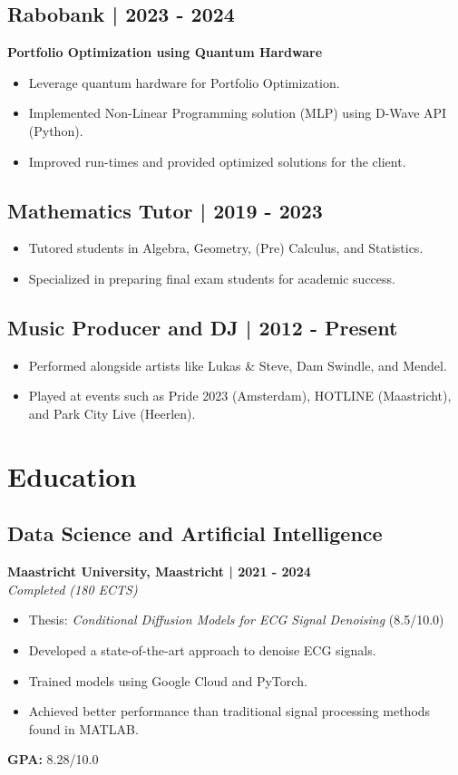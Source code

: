 \documentclass[a4paper,10pt]{article}
\begin{document}
\subsection*{Rabobank | 2023 - 2024}
\textbf{Portfolio Optimization using Quantum Hardware}
\begin{itemize}
    \item Leverage quantum hardware for Portfolio Optimization.
    \item Implemented Non-Linear Programming solution (MLP) using D-Wave API (Python).
    \item Improved run-times and provided optimized solutions for the client.
\end{itemize}

\subsection*{Mathematics Tutor | 2019 - 2023}
\begin{itemize}
    \item Tutored students in Algebra, Geometry, (Pre) Calculus, and Statistics.
    \item Specialized in preparing final exam students for academic success.
\end{itemize}

\subsection*{Music Producer and DJ | 2012 - Present}
\begin{itemize}
    \item Performed alongside artists like Lukas \& Steve, Dam Swindle, and Mendel.
    \item Played at events such as Pride 2023 (Amsterdam), HOTLINE (Maastricht), and Park City Live (Heerlen).
\end{itemize}

\section*{Education}

\subsection*{Data Science and Artificial Intelligence}
\textbf{Maastricht University, Maastricht | 2021 - 2024} \\
\textit{Completed (180 ECTS)}
\begin{itemize}
    \item Thesis: \textit{Conditional Diffusion Models for ECG Signal Denoising} (8.5/10.0)
    \item Developed a state-of-the-art approach to denoise ECG signals.
    \item Trained models using Google Cloud and PyTorch.
    \item Achieved better performance than traditional signal processing methods found in MATLAB.
\end{itemize}
\textbf{GPA:} 8.28/10.0
\end{document}
